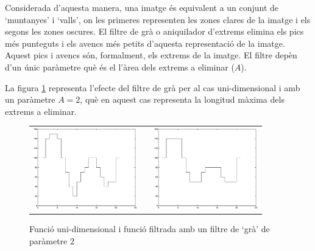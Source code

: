 \documentclass{article}
\begin{document}
Considerada d'aquesta manera, una imatge \'es equivalent a un conjunt de `muntanyes'
i `valls', on les primeres representen les zones clares de la imatge i els segons les
zones oscures. El filtre de gr\`a o aniquilador d'extrems elimina els pics m\'es 
punteguts i els avencs m\'es petits d'aquesta representaci\'o de la imatge.
Aquest pics i avencs s\'on, formalment, els extrems de la imatge.
El filtre dep\`en d'un \'unic par\`ametre qu\`e \'es el l'\`area dels extrems a eliminar ($A$).

La figura \ref{im1D} representa l'efecte del filtre de gr\`a per al cas uni-dimensional
i amb un par\`ametre $A=2$, qu\`e en aquest cas representa la longitud m\`axima dels 
extrems a eliminar.

\begin{figure}[htbp]
\begin{center}
\begin{tabular}{ccc}
\includegraphics[width=4.5cm]{im1D.eps} & & \includegraphics[width=4.5cm]{im1Dfiltrada.eps}
\end{tabular}
\caption{Funci\'o uni-dimensional i funci\'o filtrada amb un filtre de `gr\`a' de par\`ametre $2$}
\label{im1D}
\end{center}
\end{figure}
\end{document}
